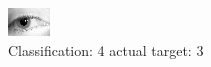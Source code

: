\begin{figure}[h!]
\begin{center}
\includegraphics[width=0.60\columnwidth]{figures/ID1322_class_4_target_3.png}
\end{center}
\caption{ Classification: 4 actual target: 3}
\label{fig:ID1322_class_4_target_3}
\end{figure}
